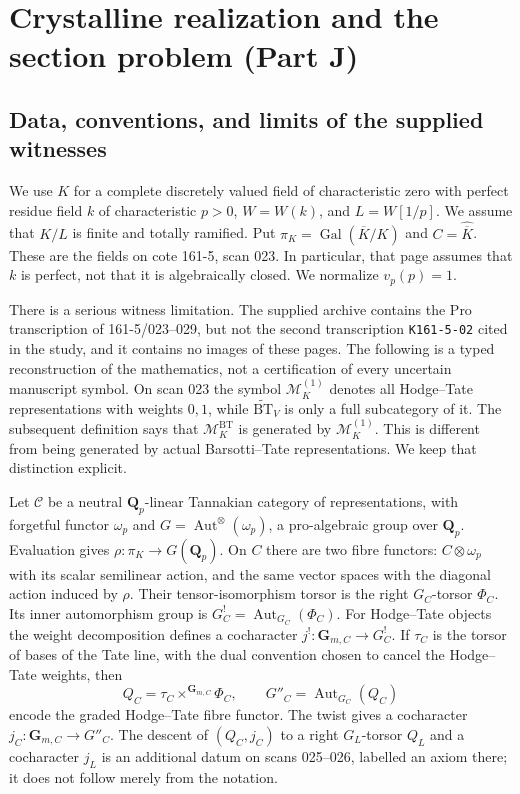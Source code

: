 \section{Crystalline realization and the section problem (Part J)}\label{sec:categoryJ}

\subsection{Data, conventions, and limits of the supplied witnesses}
We use $K$ for a complete discretely valued field of characteristic zero with
perfect residue field $k$ of characteristic $p>0$, $W=W(k)$, and $L=W[1/p]$.
We assume that $K/L$ is finite and totally ramified.  Put
$\pi_K=\operatorname{Gal}(\overline K/K)$ and $C=\widehat{\overline K}$.
These are the fields on cote 161-5, scan 023.  In particular, that page
assumes that $k$ is perfect, not that it is algebraically closed.
We normalize $v_p(p)=1$.

There is a serious witness limitation.  The supplied archive contains the
Pro transcription of 161-5/023--029, but not the second transcription
\texttt{K161-5-02} cited in the study, and it contains no images of these
pages.  The following is a typed reconstruction of the mathematics, not a
certification of every uncertain manuscript symbol.  On scan 023 the symbol
$\mathcal M_K^{(1)}$ denotes all Hodge--Tate representations with weights
$0,1$, while $\widetilde{\mathrm{BT}}_V$ is only a full subcategory of it.
The subsequent definition says that $\mathcal M_K^{\mathrm{BT}}$ is generated
by $\mathcal M_K^{(1)}$.  This is different from being generated by actual
Barsotti--Tate representations.  We keep that distinction explicit.

Let $\mathcal C$ be a neutral $\mathbf Q_p$-linear Tannakian category of
representations, with forgetful functor $\omega_p$ and
$G=\operatorname{Aut}^{\otimes}(\omega_p)$, a pro-algebraic group over
$\mathbf Q_p$.  Evaluation gives
$\rho:\pi_K\longrightarrow G(\mathbf Q_p)$.
On $C$ there are two fibre functors: $C\otimes\omega_p$ with its scalar
semilinear action, and the same vector spaces with the diagonal action
induced by $\rho$.  Their tensor-isomorphism torsor is the right $G_C$-torsor
$\Phi_C$.  Its inner automorphism group is
$G_C^!=\operatorname{Aut}_{G_C}(\Phi_C)$.
For Hodge--Tate objects the weight decomposition defines a cocharacter
$j^!:\mathbf G_{m,C}\to G_C^!$.  If $\tau_C$ is the torsor of bases of the
Tate line, with the dual convention chosen to cancel the Hodge--Tate weights,
then
\[
 Q_C=\tau_C\mathbin{\times^{\mathbf G_{m,C}}}\Phi_C,
 \qquad G''_C=\operatorname{Aut}_{G_C}(Q_C)
\]
encode the graded Hodge--Tate fibre functor.  The twist gives a cocharacter
$j_C:\mathbf G_{m,C}\to G''_C$.
The descent of $(Q_C,j_C)$ to a right $G_L$-torsor $Q_L$ and a cocharacter
$j_L$ is an additional datum on scans 025--026, labelled an axiom there;
it does not follow merely from the notation.

